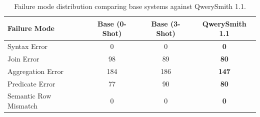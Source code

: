 \begin{table}[t]
\centering\small
\begin{tabular}{lccc}
\toprule
\textbf{Failure Mode} & \textbf{Base (0-Shot)} & \textbf{Base (3-Shot)} & \textbf{QwerySmith 1.1} \\
\midrule
Syntax Error & 0 & 0 & \textbf{0} \\
Join Error & 98 & 89 & \textbf{80} \\
Aggregation Error & 184 & 186 & \textbf{147} \\
Predicate Error & 77 & 90 & \textbf{80} \\
Semantic Row Mismatch & 0 & 0 & \textbf{0} \\
\bottomrule
\end{tabular}
\caption{Failure mode distribution comparing base systems against QwerySmith 1.1.}
\label{tab:error_taxonomy}
\end{table}
